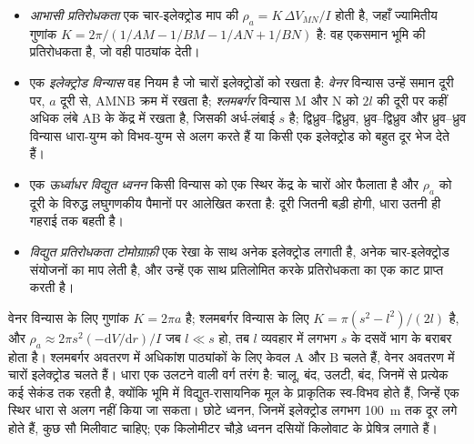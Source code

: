 \begin{definition}\label{def:b3:field-lab-methods-3:resistivity}
\leavevmode
\begin{itemize}
  \item \emph{आभासी प्रतिरोधकता} एक चार-इलेक्ट्रोड माप की
        $\rho_a = K\,\Delta V_{MN}/I$ होती है, जहाँ
        ज्यामितीय गुणांक $K = 2\pi/(1/AM - 1/BM - 1/AN + 1/BN)$ है: वह
        एकसमान भूमि की प्रतिरोधकता है, जो
        वही पाठ्यांक देती।
  \item एक \emph{इलेक्ट्रोड विन्यास} वह नियम है जो
        चारों इलेक्ट्रोडों को रखता है: \emph{वेनर} विन्यास उन्हें
        समान दूरी पर, $a$ दूरी से, AMNB क्रम में रखता है;
        \emph{श्लमबर्गर} विन्यास M और N को $2l$ की दूरी पर
        कहीं अधिक लंबे AB के केंद्र में रखता है, जिसकी अर्ध-लंबाई $s$ है; द्विध्रुव--द्विध्रुव,
        ध्रुव--द्विध्रुव और ध्रुव--ध्रुव विन्यास धारा-युग्म को विभव-युग्म से अलग करते हैं या
        किसी एक इलेक्ट्रोड को बहुत दूर भेज देते हैं।
  \item एक \emph{ऊर्ध्वाधर विद्युत ध्वनन}
        किसी विन्यास को एक स्थिर केंद्र के चारों ओर फैलाता है और
        $\rho_a$ को दूरी के विरुद्ध लघुगणकीय पैमानों पर आलेखित करता है: दूरी जितनी बड़ी होगी,
        धारा उतनी ही गहराई तक बहती है।
  \item \emph{विद्युत प्रतिरोधकता टोमोग्राफ़ी}
        एक रेखा के साथ अनेक इलेक्ट्रोड लगाती है,
        अनेक चार-इलेक्ट्रोड संयोजनों का माप लेती है, और
        उन्हें एक साथ प्रतिलोमित करके प्रतिरोधकता का एक काट प्राप्त करती है।
\end{itemize}
\end{definition}

वेनर विन्यास के लिए गुणांक $K = 2\pi a$ है; श्लमबर्गर
विन्यास के लिए $K = \pi(s^2 - l^2)/(2l)$ है, और $\rho_a \approx 2\pi s^2(-\mathrm{d}V/
\mathrm{d}r)/I$ जब $l \ll s$ हो, तब $l$ व्यवहार में लगभग
$s$ के दसवें भाग के बराबर होता है। श्लमबर्गर अवतरण में अधिकांश पाठ्यांकों के लिए केवल A और B चलते हैं,
वेनर अवतरण में चारों इलेक्ट्रोड चलते हैं। धारा एक उलटने वाली
वर्ग तरंग है: चालू, बंद, उलटी, बंद, जिनमें से प्रत्येक कई सेकंड तक रहती है, क्योंकि
भूमि में विद्युत-रासायनिक मूल के प्राकृतिक स्व-विभव होते हैं,
जिन्हें एक स्थिर धारा से अलग नहीं किया जा सकता। छोटे ध्वनन, जिनमें
इलेक्ट्रोड लगभग \qty{100}{m} तक दूर लगे होते हैं, कुछ सौ
मिलीवाट चाहिए; एक किलोमीटर चौड़े ध्वनन दसियों
किलोवाट के प्रेषित्र लगाते हैं।

